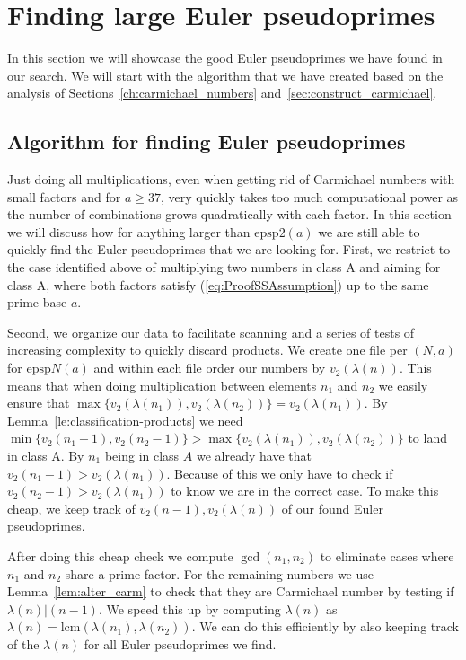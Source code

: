 \documentclass[runningheads]{amsart}
\newcommand{\epsp}{\mathrm{epsp}}
\newcommand{\lcm}{\mathrm{lcm}}
\begin{document}
\section{Finding large Euler pseudoprimes} \label{ch:results}
In this section we will showcase the good Euler pseudoprimes we have found in our
search.
We will start with the algorithm that we have created based on the analysis of
Sections~\ref{ch:carmichael_numbers}
and~\ref{sec:construct_carmichael}.

\subsection{Algorithm for finding Euler pseudoprimes} \label{sec:algorithm}
Just doing all multiplications,
even when getting rid of Carmichael numbers with small factors and for
$a\geq
37$,
very quickly takes too much computational power as the number of combinations grows
quadratically with each factor.
In this section we will discuss how for anything larger than
$\epsp2(a)$
we are still able to quickly find the Euler pseudoprimes that we are looking for.
First,
we restrict to the case identified above of multiplying two numbers in class A and
aiming for class A,
where both factors satisfy
(\ref{eq:ProofSSAssumption})
up to the same prime base $a$.

Second,
we organize our data to facilitate scanning and a series of tests of increasing complexity
to quickly discard products.
We create one file per $(N,a)$ for
$\epsp
N(a)$ and within each file order our numbers by
$v_2(\lambda(n))$.
This means that when doing multiplication between elements
$n_1$
and
$n_2$
we easily ensure that
$\max\{v_2(\lambda(n_1)),
v_2(\lambda(n_2))\}
=
v_2(\lambda(n_1))$.
By
Lemma~\ref{le:classification-products}
we need
$\min\{v_2(n_1
- 1),
v_2(n_2-1)\}
>
\max\{v_2(\lambda(n_1)),
v_2(\lambda(n_2))\}$
to land in class A.
By
$n_1$
being in class $A$ we already have that
$v_2(n_1
- 1)
>
v_2(\lambda(n_1))$.
Because of this we only have to check if
$v_2(n_2-1)
>
v_2(\lambda(n_1))$
to know we are in the correct case.
To make this cheap,
we keep track of
$v_2(n-1),
v_2(\lambda(n))$
of our found Euler pseudoprimes.

After doing this cheap check we compute
$\gcd(n_1,n_2)$
 to
eliminate cases where
$n_1$
and
$n_2$
share a prime factor.
For the remaining numbers we use
Lemma~\ref{lem:alter_carm}
to check that they are Carmichael number by testing if
$\lambda(n)|
(n-1)$.
We speed this up by computing
$\lambda(n)$
as
$\lambda(n)
=
\lcm(\lambda(n_1),\lambda(n_2))$.
We can do this efficiently by also keeping track of the
$\lambda(n)$
for all Euler pseudoprimes we find.
\relax
\end{document}
